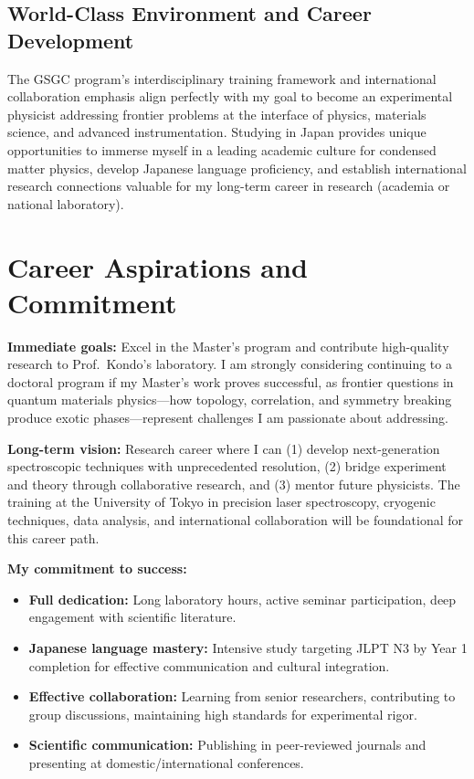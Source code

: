 \documentclass[11pt,a4paper]{article}
\begin{document}
\subsection{World-Class Environment and Career Development}

The GSGC program's interdisciplinary training framework and international collaboration emphasis align perfectly with my goal to become an experimental physicist addressing frontier problems at the interface of physics, materials science, and advanced instrumentation. Studying in Japan provides unique opportunities to immerse myself in a leading academic culture for condensed matter physics, develop Japanese language proficiency, and establish international research connections valuable for my long-term career in research (academia or national laboratory).

\section{Career Aspirations and Commitment}

\textbf{Immediate goals:} Excel in the Master's program and contribute high-quality research to Prof.~Kondo's laboratory. I am strongly considering continuing to a doctoral program if my Master's work proves successful, as frontier questions in quantum materials physics—how topology, correlation, and symmetry breaking produce exotic phases—represent challenges I am passionate about addressing.

\textbf{Long-term vision:} Research career where I can (1) develop next-generation spectroscopic techniques with unprecedented resolution, (2) bridge experiment and theory through collaborative research, and (3) mentor future physicists. The training at the University of Tokyo in precision laser spectroscopy, cryogenic techniques, data analysis, and international collaboration will be foundational for this career path.

\textbf{My commitment to success:}
\begin{itemize}
    \item \textbf{Full dedication:} Long laboratory hours, active seminar participation, deep engagement with scientific literature.
    \item \textbf{Japanese language mastery:} Intensive study targeting JLPT N3 by Year 1 completion for effective communication and cultural integration.
    \item \textbf{Effective collaboration:} Learning from senior researchers, contributing to group discussions, maintaining high standards for experimental rigor.
    \item \textbf{Scientific communication:} Publishing in peer-reviewed journals and presenting at domestic/international conferences.
\end{itemize}
\end{document}
